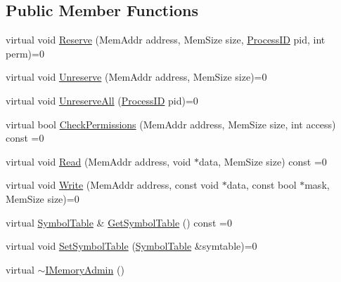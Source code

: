 \subsection*{Public Member Functions}
\begin{DoxyCompactItemize}
\item 
virtual void \hyperlink{class_simulator_1_1_i_memory_admin_a3d05616b22c17888237fb6729faefbee}{Reserve} (Mem\+Addr address, Mem\+Size size, \hyperlink{namespace_simulator_a62ef2d2c77bd54a16c39881f6266875e}{Process\+I\+D} pid, int perm)=0
\item 
virtual void \hyperlink{class_simulator_1_1_i_memory_admin_a6907084c07b1447c5dfd826ca43bd151}{Unreserve} (Mem\+Addr address, Mem\+Size size)=0
\item 
virtual void \hyperlink{class_simulator_1_1_i_memory_admin_a5da26ac320d81da2adb92d0f62cf00a6}{Unreserve\+All} (\hyperlink{namespace_simulator_a62ef2d2c77bd54a16c39881f6266875e}{Process\+I\+D} pid)=0
\item 
virtual bool \hyperlink{class_simulator_1_1_i_memory_admin_af3841786e45aa1ce6cddd03f881481fa}{Check\+Permissions} (Mem\+Addr address, Mem\+Size size, int access) const =0
\item 
virtual void \hyperlink{class_simulator_1_1_i_memory_admin_a70a61237c0d486e61ffa3a9d102041e2}{Read} (Mem\+Addr address, void $\ast$data, Mem\+Size size) const =0
\item 
virtual void \hyperlink{class_simulator_1_1_i_memory_admin_a35e57b8855fc2b99c86979d7fea43995}{Write} (Mem\+Addr address, const void $\ast$data, const bool $\ast$mask, Mem\+Size size)=0
\item 
virtual \hyperlink{class_simulator_1_1_symbol_table}{Symbol\+Table} \& \hyperlink{class_simulator_1_1_i_memory_admin_a5c78bb38973e9a786f197383985f45d7}{Get\+Symbol\+Table} () const =0
\item 
virtual void \hyperlink{class_simulator_1_1_i_memory_admin_ae07fadcfb78b83dfff1be6f7befb21fd}{Set\+Symbol\+Table} (\hyperlink{class_simulator_1_1_symbol_table}{Symbol\+Table} \&symtable)=0
\item 
virtual \hyperlink{class_simulator_1_1_i_memory_admin_a54f952a28c38c8a82e5fa2c107d01e5a}{$\sim$\+I\+Memory\+Admin} ()
\end{DoxyCompactItemize}



